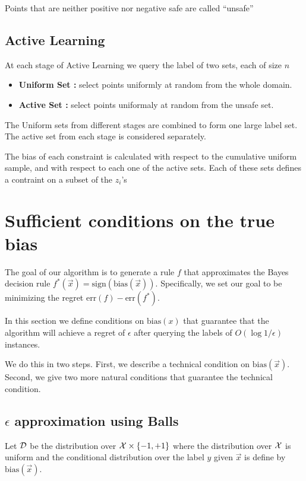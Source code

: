 \documentclass{article}
\newcommand{\err}{\mbox{err}}
\newcommand{\X}{{\cal X}}
\newcommand{\D}{{\cal D}}
\newcommand{\x}{\vec{x}}
\newcommand{\bias}{\text{bias}}
\newcommand{\sign}{\text{sign}}
\begin{document}
Points that are neither positive nor negative safe are called
``unsafe''

\subsection{Active Learning}

At each stage of Active Learning we query the label of two sets, each
of size $n$
\begin{itemize}
\item {\bf Uniform Set :} select points uniformly at random from the whole
  domain.
\item {\bf Active Set :} select points uniformaly at random from the unsafe
  set.
\end{itemize}

The Uniform sets from different stages are combined to form one
large label set. The active set from each stage is considered
separately.

The bias of each constraint is calculated with respect to the
cumulative uniform sample, and with respect to each one of the active
sets. Each of these sets defines a contraint on a subset of the $z_i$'s 

\section{Sufficient conditions on the true bias}
\newcommand{\Bayes}{f^*}
The goal of our algorithm is to generate a rule $f$ that
approximates the Bayes decision rule $\Bayes(\x) = \sign(\bias(\x))$.
Specifically, we set our goal to be minimizing the regret $\err(f) - \err(\Bayes)$.

In this section we define conditions on $\bias(x)$ that guarantee that
the algorithm will achieve a regret of $\epsilon$ after querying the
labels of $O(\log 1/\epsilon)$ instances.

We do this in two steps. First, we describe a technical condition on
$\bias(\x)$. Second, we give two more natural conditions that
guarantee the technical condition.

\subsection{$\epsilon$ approximation using Balls}

Let $\D$ be the distribution over $\X\times \{-1,+1\}$ where the
distribution over $\X$ is uniform and the conditional distribution
over the label $y$ given $\x$ is define by $\bias(\x)$.
\end{document}
